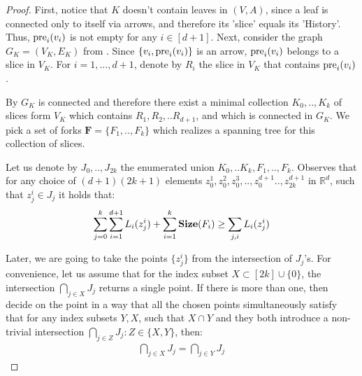   \begin{proof}
First, notice that $K$ doesn't contain leaves in $(V,A)$, since a leaf is connected only to itself via arrows, and therefore its 'slice' equals its 'History'. Thus, $\text{pre}_{i}(v_{i})$ is not empty for any $i \in [d+1]$. Next, consider the graph $G_{K} = (V_{K},E_{K})$ from . Since $\{ v_{i}, \text{pre}_{i}(v_{i}) \}$ is an arrow, $\text{pre}_{i}(v_{i})$ belongs to a slice in $V_{K}$. For $i=1,\ldots,d+1$, denote by $R_{i}$ the slice in $V_{K}$ that contains $\text{pre}_{i}(v_i)$.

    By  $G_{K}$ is connected and therefore there exist a minimal collection $K_{0},..,K_{k}$ of slices form $V_{K}$ which contains $R_{1},R_{2},..R_{d+1}$, and which is connected in $G_{K}$. We pick a set of forks $\mathbf{F} = \{F_{1},..,F_{k} \}$ which realizes a spanning tree for this collection of slices. %


   
    Let us denote by $J_{0},..,J_{2k}$ the enumerated union $K_{0},..K_{k},F_{1},..,F_{k}$. Observes that for any choice of $(d+1)(2k+1)$ elements $z_{0}^{1},z_{0}^{2}, z_{0}^{3},..,z_{0}^{d+1}..,z_{2k}^{d+1}$ in $\mathbb{R}^{d}$, such that $z_{j}^{i} \in J_{j}$ it holds that:
    \begin{equation}
      \label{equ:spanlow}
      \begin{split}
         \sum_{j=0}^{k}\sum_{i=1}^{d+1}L_{i}(z_{j}^{i}) + \sum^{k}_{i=1}\mathbf{Size}(F_{i})  \ge \sum_{j,i}L_{i}(z_{j}^{i})
      \end{split}
    \end{equation}

Later, we are going to take the points $\{z_{j}^{i}\}$ from the intersection of $J_{j}$'s. For convenience, let us assume that for the index subset $X \subset [2k]\cup\{0\}$, the intersection $\bigcap_{j \in X}J_{j}$ returns a single point. If there is more than one, then decide on the point in a way that all the chosen points simultaneously satisfy that for any index subsets $Y, X$, such that $X \cap Y$ and they both introduce a non-trivial intersection $\bigcap_{j \in Z} J_{j} : Z\in \{X,Y\}$, then:
    \begin{equation*}
      \begin{split}
        \bigcap_{j \in X} J_{j} = \bigcap_{j \in Y } J_{j} 
      \end{split}
    \end{equation*}


\end{proof}
